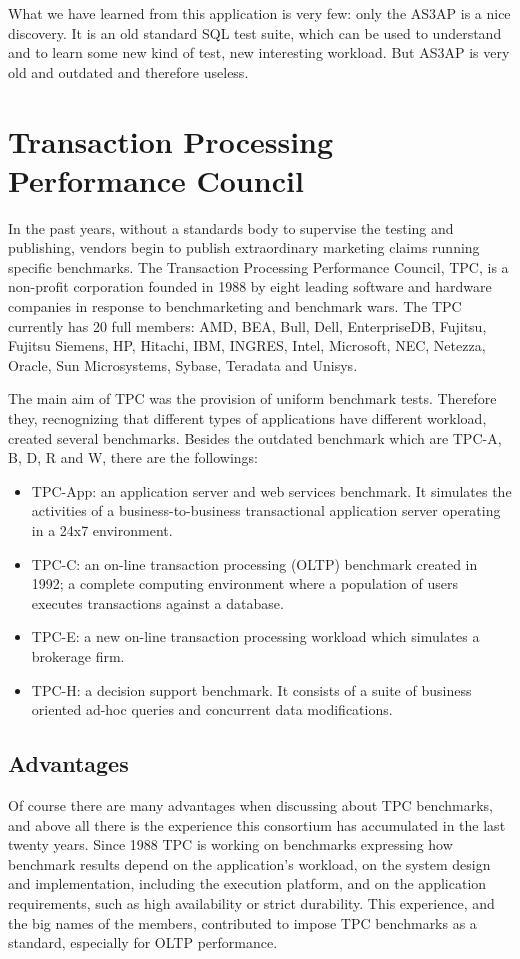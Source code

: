 What we have learned from this application is very few: only the AS3AP is a nice discovery. It is an old standard SQL test suite, which can be used to understand and to learn some new kind of test, new interesting workload. But AS3AP is very old and outdated and therefore useless.
	
	\section{Transaction Processing Performance Council}
In the past years, without a standards body to supervise the testing and publishing, vendors begin to publish extraordinary marketing claims running specific benchmarks. The Transaction Processing Performance Council, TPC, is a non-profit corporation founded in 1988 by eight leading software and hardware companies in response to benchmarketing and benchmark wars. The TPC currently has 20 full members: AMD, BEA, Bull, Dell, EnterpriseDB, Fujitsu, Fujitsu Siemens, HP, Hitachi, IBM, INGRES, Intel, Microsoft, NEC, Netezza, Oracle, Sun Microsystems, Sybase, Teradata and Unisys.

The main aim of TPC was the provision of uniform benchmark tests. Therefore they, recnognizing that different types of applications have different workload, created several benchmarks. Besides the outdated benchmark which are TPC-A, B, D, R and W, there are the followings: 
\begin{itemize}
	\item TPC-App: an application server and web services benchmark. It simulates the activities of a business-to-business transactional application server operating in a 24x7 environment.
	\item TPC-C: an on-line transaction processing (OLTP) benchmark created in 1992; a complete computing environment where a population of users executes transactions against a database.
	\item TPC-E: a new on-line transaction processing workload which simulates a brokerage firm.
	\item TPC-H: a decision support benchmark. It consists of a suite of business oriented ad-hoc queries and concurrent data modifications.
\end{itemize}

		\subsection{Advantages}
Of course there are many advantages when discussing about TPC benchmarks, and above all there is the experience this consortium has accumulated in the last twenty years. Since 1988 TPC is working on benchmarks expressing how benchmark results depend on the application's workload, on the system design and implementation, including the execution platform, and on the application requirements, such as high availability or strict durability. This experience, and the big names of the members, contributed to impose TPC benchmarks as a standard, especially for OLTP performance.

